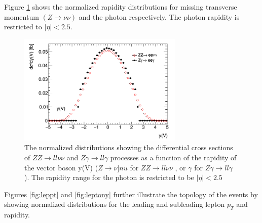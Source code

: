\documentclass[11pt,a4paper,openright,twoside]{report}
\newcommand{\ZZ}{$ZZ\to ll\nu\nu$ }
\newcommand{\Zg}{$Z\gamma\to ll\gamma$ }
\begin{document}
Figure \ref{fig:yy} shows the normalized rapidity distributions for missing transverse momentum $(Z\to\nu\nu)$ and the photon respectively. The photon rapidity is restricted to $|\eta|<2.5$.
\begin{figure}[H]
\centering
	\includegraphics[width=0.7\textwidth]{yy.png}
	\caption{The normalized distributions showing the differential cross sections of \ZZ and \Zg processes as a function of the rapidity of the vector boson y(V) ($Z\to\nu]nu$ for \ZZ, or $\gamma$ for \Zg). The rapidity range for the photon is restricted to be $|\eta|<2.5$}
	\label{fig:yy}
\end{figure}
Figures \ref{fig:leppt} and \ref{fig:leptony} further illustrate the topology of the events by showing normalized distributions for the leading and subleading lepton $p_T$ and rapidity.
\end{document}
